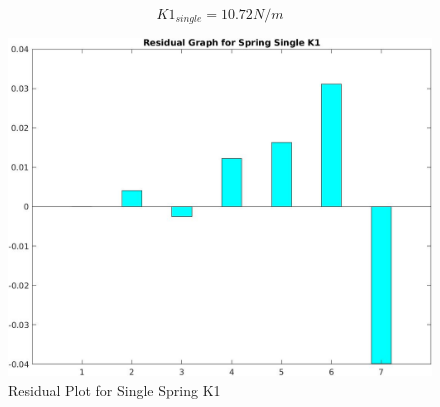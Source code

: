 $$ K1_{single} = 10.72 N/m $$

\newpage
\begin{center}
\begin{figure}[h!]
    \centering
    \includegraphics[width=\textwidth]{figures/K1_S_R.jpg}
    \caption{Residual Plot for Single Spring K1}
    \label{fig:k1_S_R}
\end{figure}
\end{center}

